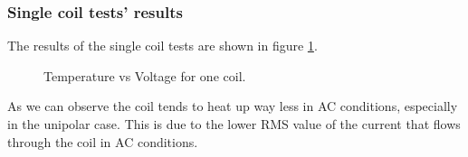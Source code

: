 \subsubsection{Single coil tests' results}
The results of the single coil tests are shown in figure \ref{fig: Single_coil_heating_tests}.
\begin{figure}
    \centering
    \caption{Temperature vs Voltage for one coil.}
    \label{fig: Single_coil_heating_tests}
\end{figure}
As we can observe the coil tends to heat up way less in AC conditions, especially in the unipolar case.
This is due to the lower RMS value of the current that flows through the coil in AC conditions.

